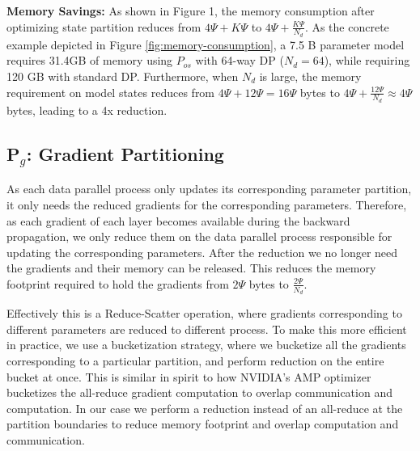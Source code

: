 \textbf{Memory Savings: } As shown in Figure 1, the memory consumption after optimizing state partition reduces from $4\Psi+K\Psi$ to $4\Psi + \frac{K\Psi}{N_d}$.  As the concrete example depicted in Figure \ref{fig:memory-consumption}, a 7.5 B parameter model requires 31.4GB of memory using $P_{os}$ with 64-way DP ($N_d = 64$), while requiring 120 GB with standard DP.
Furthermore, when $N_d$ is large, the memory requirement on model states reduces from $4\Psi+12\Psi=16\Psi$ bytes to $ 4 \Psi + \frac{12 \Psi}{N_d} \approx 4 \Psi$ bytes, leading to a 4x reduction. 

\subsection{P$_g$: Gradient Partitioning}\label{sec:pg}
As each data parallel process only updates its corresponding parameter partition, it only needs the reduced gradients for the corresponding parameters. Therefore, as each gradient of each layer becomes available during the backward propagation, we only reduce them on the data parallel process responsible for updating the corresponding parameters. After the reduction we no longer need the gradients and their memory can be released. This reduces the memory footprint required to hold the gradients from $2\Psi$ bytes to $\frac{2\Psi}{N_d}$. 

Effectively this is a Reduce-Scatter operation, where gradients corresponding to different parameters are reduced to different process. To make this more efficient in practice, we use a bucketization strategy, where we bucketize all the gradients corresponding to a particular partition, and perform reduction on the entire bucket at once. 
This is similar in spirit to how NVIDIA's AMP \cite{nvidia-apex} optimizer bucketizes the all-reduce gradient computation to overlap communication and computation. In our case we perform a reduction instead of an all-reduce at the partition boundaries to reduce memory footprint and overlap computation and communication. %

